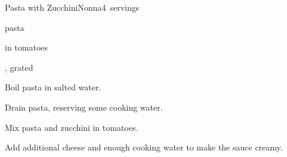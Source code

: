 \begin{recipe}{Pasta with Zucchini}{Nonna}{4~servings}

\begin{ingredients}
\item {} pasta
\item {} in tomatoes 
\item {}, grated
\end{ingredients}

\begin{directions}
\item Boil pasta in salted water.
\item Drain pasta, reserving some cooking water.
\item Mix pasta and zucchini in tomatoes.
\item Add additional cheese and enough cooking water to make the sauce creamy.
\end{directions}

\end{recipe}
